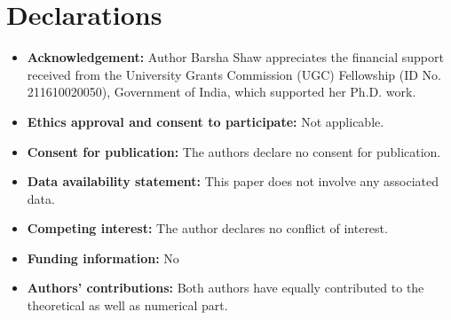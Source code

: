 \documentclass[smallextended,referee,envcountsect]{svjour3}
\begin{document}
\section*{Declarations}
\begin{itemize}
    \item {\bf Acknowledgement:} Author Barsha Shaw appreciates the financial support received from the University Grants Commission (UGC) Fellowship (ID No. 211610020050), Government of India, which supported her Ph.D. work.
    \item {\bf Ethics approval and consent to participate:} Not applicable.\\
\item {\bf Consent for publication:} The authors declare no consent for publication.\\
\item {\bf Data availability statement:} This paper does not involve any associated data.\\
\item {\bf Competing interest:} The author declares no conflict of interest.\\
\item {\bf Funding information:} No\\
\item {\bf Authors' contributions:} Both authors have equally contributed to the theoretical as well as numerical part.\\
\end{itemize}
\end{document}
